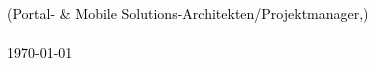 \newcommand{\cccvname}{Bernd Zuther}
\newcommand{\cccvjobtitle}{Portal- \& Mobile Solutions-Architekten/Projektmanager,}

\NoBgThispage
\vspace*{18.5cm}
\noindent
\textcolor{black}{
{\huge (\cccvjobtitle)}\\
\\[8pt]
{\today}
}

